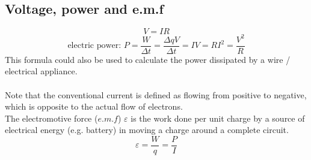 \documentclass[a4paper,12pt]{article}
\begin{document}
\subsection{Voltage, power and e.m.f}
\[V=IR\]
\[\text{electric power: } P=\dfrac{W}{\Delta t}=\dfrac{\Delta qV}{\Delta t} = IV=RI^2=\dfrac{V^2}{R}\]
This formula could also be used to calculate the power dissipated by a wire / electrical appliance.\\\\
Note that the conventional current is defined as flowing from positive to negative, which is opposite to the actual flow of electrons.\\
The electromotive force ($e.m.f$) $\varepsilon$ is the work done per unit charge by a source of electrical energy (e.g. battery) in moving a charge around a complete circuit.
\[\varepsilon = \dfrac{W}{q}=\dfrac{P}{I}\]
\end{document}
